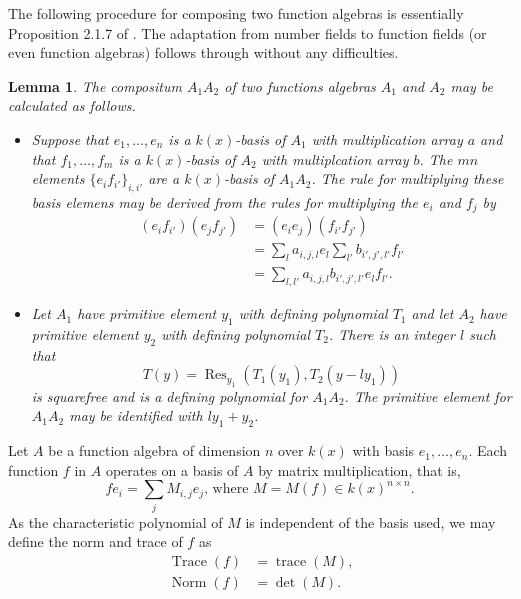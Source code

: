 \documentclass[12pt,reqno]{amsart}
\numberwithin{equation}{section}
\newtheorem{lemma}[theorem]{Lemma}
\newcommand{\op}[1]  { \operatorname{ #1 }}
\begin{document}
The following procedure for composing two function algebras is essentially Proposition 2.1.7 of \cite{adv2}. The adaptation from number fields to function fields (or even function algebras) follows through without any difficulties.
\begin{lemma}
\label{lemma_fa_rep}
 The compositum $A_1 A_2$ of two functions algebras $A_1$ and $A_2$ may be calculated as follows.
\begin{itemize}
\item[(M)] Suppose that $e_1,\dots,e_n$ is a $k(x)$-basis of $A_1$ with multiplication array $a$ and that $f_1,\dots,f_m$ is a $k(x)$-basis of $A_2$ with multiplcation array $b$. The $mn$ elements $\{e_i f_{i'}\}_{i,i'}$ are a $k(x)$-basis of $A_1 A_2$. The rule for multiplying these basis elemens may be derived from the rules for multiplying the $e_i$ and $f_j$ by
\begin{align*}
 (e_i f_{i'}) (e_{j} f_{j'}) &= (e_i e_{j}) (f_{i'} f_{j'})\\
&= \sum_l a_{i,j,l} e_l \sum_{l'} b_{i',j',l'} f_{l'}\\
&= \sum_{l,l'} a_{i,j,l} b_{i',j',l'} e_l f_{l'}\text{.}
\end{align*}

\item[(P)] Let $A_1$ have primitive element $y_1$ with defining polynomial $T_1$ and let $A_2$ have primitive element $y_2$ with defining polynomial $T_2$. There is an integer $l$ such that
\begin{equation*}
 T(y) = \op{Res}_{y_1} ( T_1(y_1), T_2(y-l y_1) )
\end{equation*}
is squarefree and is a defining polynomial for $A_1 A_2$. The primitive element for $A_1 A_2$ may be identified with $l y_1+y_2$.
\end{itemize}
\end{lemma}

Let $A$ be a function algebra of dimension $n$ over $k(x)$ with basis $e_1,\dots,e_n$. Each function $f$ in $A$ operates on a basis of $A$ by matrix multiplication, that is,
\begin{equation*}
 f e_i = \sum_{j} M_{i,j} e_j\text{,  where } M = M(f) \in k(x)^{n \times n}\text{.}
\end{equation*}
As the characteristic polynomial of $M$ is independent of the basis used, we may define the norm and trace of $f$ as
\begin{align*}
 \op{Trace}(f) &= \op{trace}(M)\text{,}\\
 \op{Norm}(f) &= \det(M)\text{.}
\end{align*}
\end{document}
